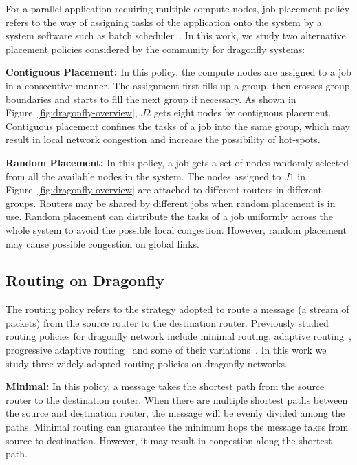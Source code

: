 For a parallel application requiring multiple compute nodes, job placement policy refers to the way of assigning tasks of the application onto the system by a system software such as batch scheduler~\cite{xu-cluster14}. In this work, we study two alternative placement policies considered by the community for dragonfly systems: 


\textbf{Contiguous Placement:} In this policy, the compute nodes are assigned to a job in a consecutive manner. The assignment first fills up a group, then crosses group boundaries and starts to fill the next group if necessary. As shown in Figure~\ref{fig:dragonfly-overview}, $J2$ gets eight nodes by contiguous placement. Contiguous placement confines the tasks of a job into the same group, which may result in local network congestion and increase the possibility of hot-spots. 

\textbf{Random Placement:} In this policy, a job gets a set of nodes randomly selected from all the available nodes in the system. The nodes assigned to $J1$ in Figure~\ref{fig:dragonfly-overview} are attached to different routers in different groups. Routers may be shared by different jobs when random placement is in use. Random placement can distribute the tasks of a job uniformly across the whole system to avoid the possible local congestion. However, random placement may cause possible congestion on global links.


\subsection{Routing on Dragonfly}
\label{sec:routing-schemes}

The routing policy refers to the strategy adopted to route a message (a stream of packets) from the source router to the destination router. Previously studied routing policies for dragonfly network include minimal routing, adaptive routing~\cite{dally-dragonfly}, progressive adaptive routing~\cite{jiang} and some of their variations~\cite{won-prog-adaptive}. In this work we study three widely adopted routing policies on dragonfly networks.

\textbf{Minimal:} In this policy, a message takes the shortest path from the source router to the destination router. When there are multiple shortest paths between the source and destination router, the message will be evenly divided among the paths. Minimal routing can guarantee the minimum hops the message takes from source to destination. However, it may result in congestion along the shortest path. 

